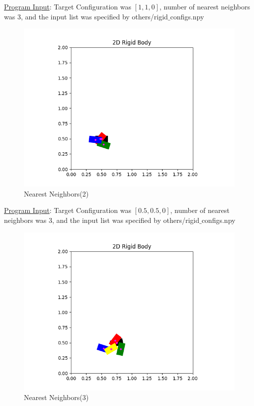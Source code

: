 \documentclass{article}
\begin{document}
\underline{Program Input}: Target Configuration was $[1, 1, 0]$, number of nearest neighbors was 3, and the input list was specified by others/rigid$\_$configs.npy
\newpage 
\begin{figure}[h!]
	\includegraphics[width= 0.9 \linewidth]{P2_NearestNeighbor(2).png}
	\centering
	\caption{Nearest Neighbors(2)}
	\label{P2_NearestNeighbor(2).png}
\end{figure}

\underline{Program Input}: Target Configuration was $[0.5, 0.5, 0]$, number of nearest neighbors was 3, and the input list was specified by others/rigid$\_$configs.npy

\newpage 
\begin{figure}[h!]
	\includegraphics[width= 0.9 \linewidth]{P2_NearestNeighbor(3).png}
	\centering
	\caption{Nearest Neighbors(3)}
	\label{P2_NearestNeighbor(3).png}
\end{figure}
\end{document}
